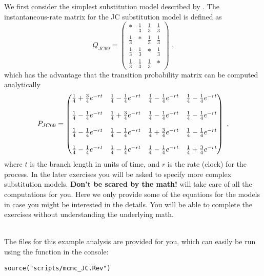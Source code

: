 We first consider the simplest substitution model described by \cite{Jukes1969}.
The instantaneous-rate matrix for the JC substitution model is defined as
\begin{equation*}
Q_{JC69} = \begin{pmatrix} 
{*} & \frac{1}{3} & \frac{1}{3} & \frac{1}{3} \\ 
\frac{1}{3} & {*} & \frac{1}{3} & \frac{1}{3} \\ 
\frac{1}{3} & \frac{1}{3} & {*} & \frac{1}{3} \\ 
\frac{1}{3} & \frac{1}{3} & \frac{1}{3} & {*}  
\end{pmatrix} \mbox{  ,}
\end{equation*}
which has the advantage that the transition probability matrix can be computed analytically
\begin{equation*}
P_{JC69} = \begin{pmatrix} {{1\over4} + {3\over4}e^{-rt}} & {{1\over4} - {1\over4}e^{-rt}} & {{1\over4} - {1\over4}e^{-rt}} & {{1\over4} - {1\over4}e^{-rt}} \\\\ {{1\over4} - {1\over4}e^{-rt}} & {{1\over4} + {3\over4}e^{-rt}} & {{1\over4} - {1\over4}e^{-rt}} & {{1\over4} - {1\over4}e^{-rt}} \\\\ {{1\over4} - {1\over4}e^{-rt}} & {{1\over4} - {1\over4}e^{-rt}} & {{1\over4} + {3\over4}e^{-rt}} & {{1\over4} - {1\over4}e^{-rt}} \\\\ {{1\over4} - {1\over4}e^{-rt}} & {{1\over4} - {1\over4}e^{-rt}} & {{1\over4} - {1\over4}e^{-rt}} & {{1\over4} + {3\over4}e^{-rt}}  
\end{pmatrix} \mbox{  ,}
\end{equation*}
where $t$ is the branch length in units of time, and $r$ is the rate (clock) for the process.
In the later exercises you will be asked to specify more complex substitution models.
\textbf{Don't be scared by the math!}
\RevBayes will take care of all the computations for you.
Here we only provide some of the equations for the models in case you might be interested in the details.
You will be able to complete the exercises without understanding the underlying math.


\noindent \\ \impmark The files for this example analysis are provided for you, which can easily be run using the  function in the \RevBayes console:
{\tt \begin{snugshade*}
\begin{lstlisting}
source("scripts/mcmc_JC.Rev")
\end{lstlisting}
\end{snugshade*}}

